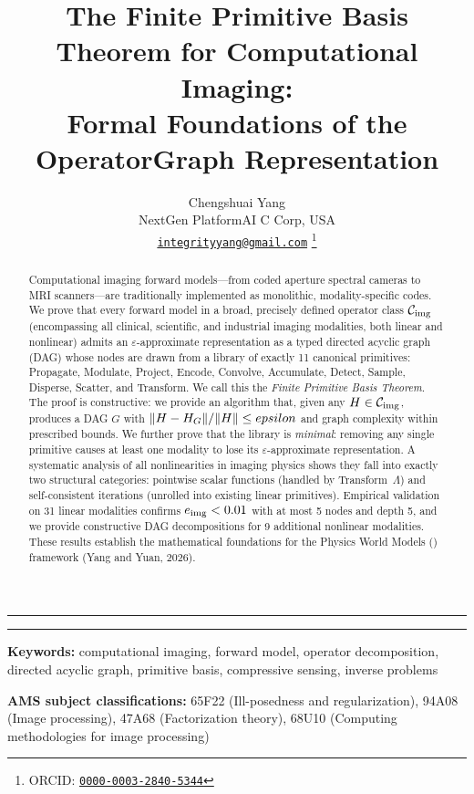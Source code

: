 \documentclass[11pt]{article}
\title{The Finite Primitive Basis Theorem for Computational Imaging:\\
Formal Foundations of the OperatorGraph Representation}
\author{%
  Chengshuai Yang\\[0.4em]
  \small NextGen PlatformAI C Corp, USA\\[0.15em]
  \small \href{mailto:integrityyang@gmail.com}{\texttt{integrityyang@gmail.com}}%
  \thanks{ORCID: \href{https://orcid.org/0000-0003-2840-5344}{\texttt{0000-0003-2840-5344}}}%
}
\date{}
\begin{document}
\maketitle

\noindent\rule{\linewidth}{0.4pt}
\begin{abstract}
Computational imaging forward models---from coded aperture spectral cameras to MRI scanners---are traditionally implemented as monolithic, modality-specific codes. We prove that every forward model in a broad, precisely defined operator class $\mathcal{C}_{\mathrm{img}}$ (encompassing all clinical, scientific, and industrial imaging modalities, both linear and nonlinear) admits an $\varepsilon$-approximate representation as a typed directed acyclic graph (DAG) whose nodes are drawn from a library of exactly 11 canonical primitives: Propagate, Modulate, Project, Encode, Convolve, Accumulate, Detect, Sample, Disperse, Scatter, and Transform. We call this the \emph{Finite Primitive Basis Theorem}. The proof is constructive: we provide an algorithm that, given any $H \in \mathcal{C}_{\mathrm{img}}$, produces a DAG $G$ with $\|H - H_{G}\|/\|H\| \leq epsilon$ and graph complexity within prescribed bounds. We further prove that the library is \emph{minimal}: removing any single primitive causes at least one modality to lose its $\varepsilon$-approximate representation. A systematic analysis of all nonlinearities in imaging physics shows they fall into exactly two structural categories: pointwise scalar functions (handled by Transform~$\Lambda$) and self-consistent iterations (unrolled into existing linear primitives). Empirical validation on 31 linear modalities confirms $e_{\mathrm{img}} < 0.01$ with at most 5 nodes and depth 5, and we provide constructive DAG decompositions for 9 additional nonlinear modalities. These results establish the mathematical foundations for the Physics World Models (\pwm{}) framework (Yang and Yuan, 2026).
\end{abstract}
\noindent\rule{\linewidth}{0.4pt}

\smallskip
\noindent\textbf{Keywords:} computational imaging, forward model, operator decomposition,
directed acyclic graph, primitive basis, compressive sensing, inverse problems

\smallskip
\noindent\textbf{AMS subject classifications:} 65F22 (Ill-posedness and regularization),
94A08 (Image processing), 47A68 (Factorization theory),
68U10 (Computing methodologies for image processing)
\end{document}
